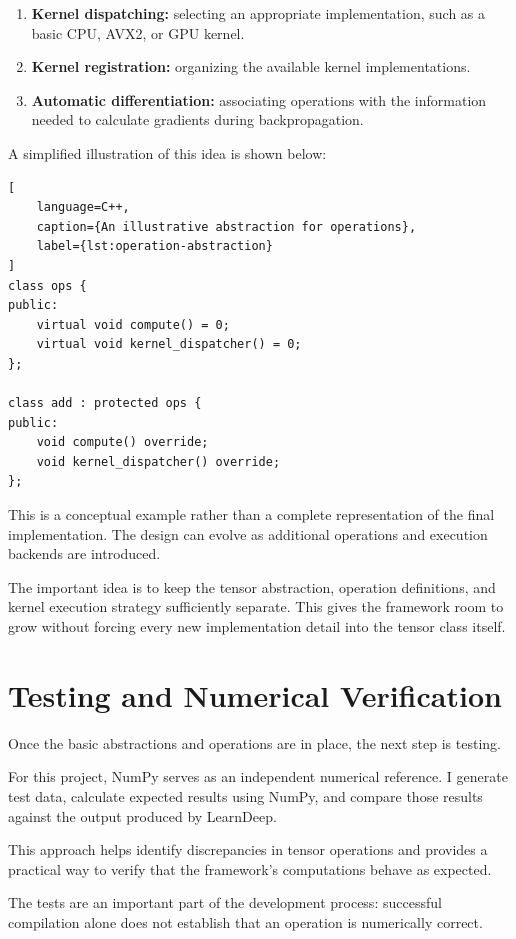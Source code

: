 \begin{enumerate}
    \item \textbf{Kernel dispatching:} selecting an appropriate implementation, such as a basic CPU, AVX2, or GPU kernel.
    \item \textbf{Kernel registration:} organizing the available kernel implementations.
    \item \textbf{Automatic differentiation:} associating operations with the information needed to calculate gradients during backpropagation.
\end{enumerate}

A simplified illustration of this idea is shown below:

\begin{lstlisting}[
    language=C++,
    caption={An illustrative abstraction for operations},
    label={lst:operation-abstraction}
]
class ops {
public:
    virtual void compute() = 0;
    virtual void kernel_dispatcher() = 0;
};

class add : protected ops {
public:
    void compute() override;
    void kernel_dispatcher() override;
};
\end{lstlisting}

This is a conceptual example rather than a complete representation of the final implementation. The design can evolve as additional operations and execution backends are introduced.

The important idea is to keep the tensor abstraction, operation definitions, and kernel execution strategy sufficiently separate. This gives the framework room to grow without forcing every new implementation detail into the tensor class itself.

\section{Testing and Numerical Verification}

Once the basic abstractions and operations are in place, the next step is testing.

For this project, NumPy serves as an independent numerical reference. I generate test data, calculate expected results using NumPy, and compare those results against the output produced by LearnDeep.

This approach helps identify discrepancies in tensor operations and provides a practical way to verify that the framework's computations behave as expected.

The tests are an important part of the development process: successful compilation alone does not establish that an operation is numerically correct.

